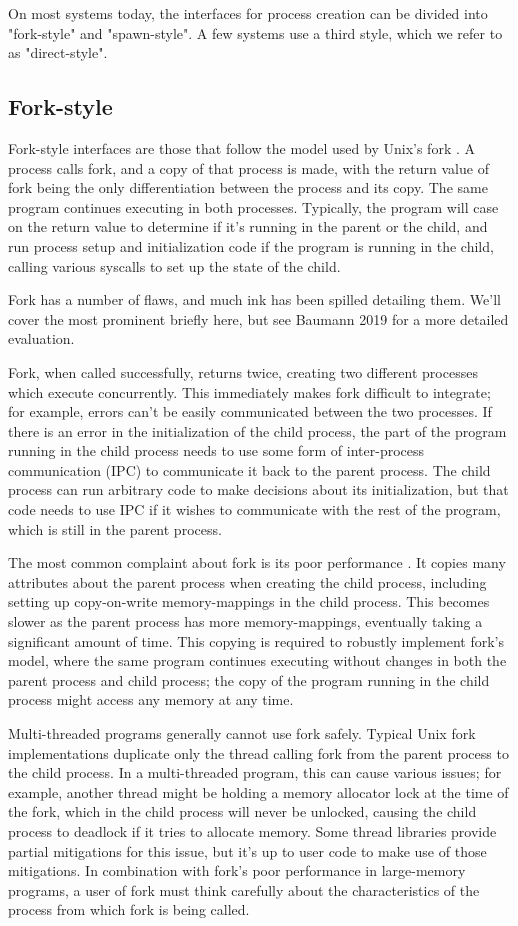 \documentclass{acmart}
\begin{document}
On most systems today,
the interfaces for process creation
can be divided into "fork-style" and "spawn-style".
A few systems use a third style, which we refer to as "direct-style".
\subsection{Fork-style}
Fork-style interfaces are those that follow the model used by Unix's fork \cite{forkhist}.
A process calls fork, and a copy of that process is made,
with the return value of fork being the only differentiation between the process and its copy.
The same program continues executing in both processes.
Typically, the program will case on the return value to determine if it's running in the parent or the child,
and run process setup and initialization code if the program is running in the child,
calling various syscalls to set up the state of the child.

Fork has a number of flaws,
and much ink has been spilled detailing them.
We'll cover the most prominent briefly here,
but see Baumann 2019 \cite{forkroad} for a more detailed evaluation.

Fork, when called successfully, returns twice,
creating two different processes which execute concurrently.
This immediately makes fork difficult to integrate;
for example, errors can't be easily communicated between the two processes.
If there is an error in the initialization of the child process,
the part of the program running in the child process
needs to use some form of inter-process communication (IPC) to communicate it back to the parent process.
The child process can run arbitrary code to make decisions about its initialization,
but that code needs to use IPC if it wishes to communicate with the rest of the program,
which is still in the parent process.

The most common complaint about fork is its poor performance \cite{forkroad}.
It copies many attributes about the parent process when creating the child process,
including setting up copy-on-write memory-mappings in the child process.
This becomes slower as the parent process has more memory-mappings,
eventually taking a significant amount of time.
This copying is required to robustly implement fork's model,
where the same program continues executing without changes in both the parent process and child process;
the copy of the program running in the child process might access any memory at any time.

Multi-threaded programs generally cannot use fork safely.
Typical Unix fork implementations duplicate only the thread calling fork from the parent process to the child process.
In a multi-threaded program, this can cause various issues;
for example, another thread might be holding a memory allocator lock at the time of the fork,
which in the child process will never be unlocked,
causing the child process to deadlock if it tries to allocate memory.
Some thread libraries provide partial mitigations for this issue,
but it's up to user code to make use of those mitigations.
In combination with fork's poor performance in large-memory programs,
a user of fork must think carefully
about the characteristics of the process from which fork is being called.
\end{document}
